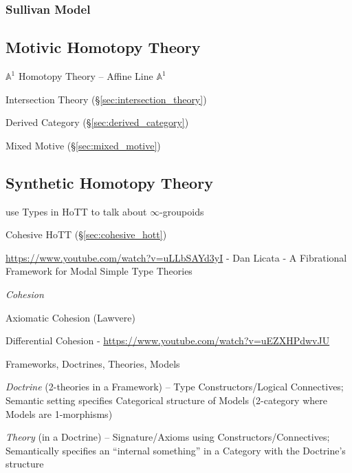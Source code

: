 \subsubsection{Sullivan Model}\label{sec:sullivan_model}



\subsection{Motivic Homotopy Theory}\label{sec:motivic_homotopy}

$\mathbb{A}^1$ Homotopy Theory -- Affine Line $\mathbb{A}^1$

\fist Intersection Theory (\S\ref{sec:intersection_theory})

Derived Category (\S\ref{sec:derived_category})

Mixed Motive (\S\ref{sec:mixed_motive})



\subsection{Synthetic Homotopy Theory}\label{sec:synthetic_homotopy_theory}

use Types in HoTT to talk about $\infty$-groupoids

\fist Cohesive HoTT (\S\ref{sec:cohesive_hott})

\url{https://www.youtube.com/watch?v=uLLbSAYd3yI} - Dan Licata - A Fibrational
Framework for Modal Simple Type Theories

\emph{Cohesion}

Axiomatic Cohesion (Lawvere)

Differential Cohesion - \url{https://www.youtube.com/watch?v=uEZXHPdwvJU}

Frameworks, Doctrines, Theories, Models

\emph{Doctrine} (2-theories in a Framework) -- Type Constructors/Logical
Connectives; Semantic setting specifies Categorical structure of Models
(2-category where Models are 1-morphisms)

\emph{Theory} (in a Doctrine) -- Signature/Axioms using
Constructors/Connectives; Semantically specifies an ``internal something'' in a
Category with the Doctrine's structure

